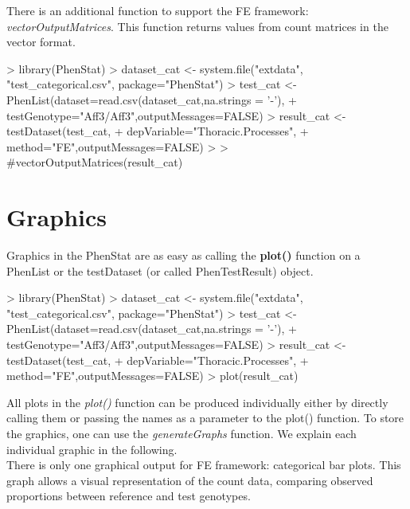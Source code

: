 \documentclass[a4paper]{article}
\begin{document}
There is an additional function to support the FE framework: \textit{vectorOutputMatrices}. This function returns
values from count matrices in the vector format.

\begin{Schunk}
\begin{Sinput}
> library(PhenStat)
> dataset_cat <- system.file("extdata", "test_categorical.csv", package="PhenStat")
> test_cat <- PhenList(dataset=read.csv(dataset_cat,na.strings = '-'),
+                      testGenotype="Aff3/Aff3",outputMessages=FALSE)
> result_cat <- testDataset(test_cat,
+                           depVariable="Thoracic.Processes",
+                           method="FE",outputMessages=FALSE)
> 
> #vectorOutputMatrices(result_cat)
\end{Sinput}
\end{Schunk}

\section{Graphics}
Graphics in the PhenStat are as easy as calling the \textbf{plot()} function on a PhenList or the testDataset (or called PhenTestResult) object.

\begin{Schunk}
\begin{Sinput}
> library(PhenStat)
> dataset_cat <- system.file("extdata", "test_categorical.csv", package="PhenStat")
> test_cat <- PhenList(dataset=read.csv(dataset_cat,na.strings = '-'),
+                      testGenotype="Aff3/Aff3",outputMessages=FALSE)
> result_cat <- testDataset(test_cat,
+                           depVariable="Thoracic.Processes",
+                           method="FE",outputMessages=FALSE)
> plot(result_cat)
\end{Sinput}
\end{Schunk}



All plots in the \emph{plot()} function can be produced individually either by directly calling them or passing the names as a parameter to the plot() function. To store the graphics, one can use the
\textit{generateGraphs} function. We explain each individual graphic in the following.\\


There is only one graphical output for FE framework: categorical bar plots. This graph allows a visual representation
of the count data, comparing observed proportions between reference and test genotypes.
\end{document}
